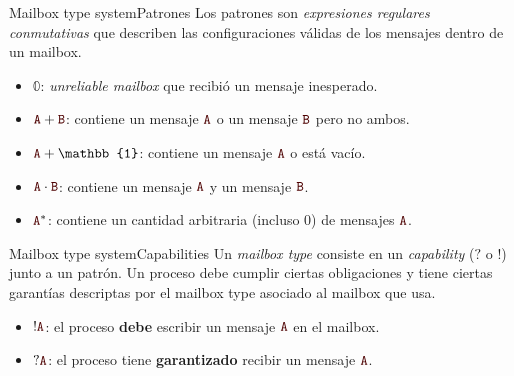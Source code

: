 \documentclass{beamer}
\newcommand{\msgtag}[1]{\texttt{\textcolor{msg-color}{#1}}}
\begin{document}
\begin{frame}{Mailbox type system}{Patrones}
    Los patrones son \emph{expresiones regulares conmutativas} que describen las configuraciones válidas de los mensajes dentro de un mailbox.
    \vspace{1em}
    \begin{itemize}
        \item $\mathbb{0}$: \emph{unreliable mailbox} que recibió un mensaje inesperado.
        \item $\msgtag{A} + \msgtag{B}$: contiene un mensaje $\msgtag{A}$ o un mensaje $\msgtag{B}$ pero no ambos.
        \item $\msgtag{A} + \mathbb{1}$: contiene un mensaje $\msgtag{A}$ o está vacío.
        \item $\msgtag{A} \cdot \msgtag{B}$: contiene un mensaje $\msgtag{A}$ y un mensaje $\msgtag{B}$.
        \item $\msgtag{A}^\ast$: contiene un cantidad arbitraria (incluso $0$) de mensajes $\msgtag{A}$.
    \end{itemize}
\end{frame}

\begin{frame}{Mailbox type system}{Capabilities}
    Un \emph{mailbox type} consiste en un \emph{capability} ($?$ o $!$) junto a un patrón. Un proceso debe cumplir ciertas obligaciones y tiene ciertas garantías descriptas por el mailbox type asociado al mailbox que usa.
    \vspace{1em}
    \begin{itemize}
        \item $!\msgtag{A}$: el proceso \textbf{debe} escribir un mensaje $\msgtag{A}$ en el mailbox.
        \item $?\msgtag{A}$: el proceso tiene \textbf{garantizado} recibir un mensaje $\msgtag{A}$.
    \end{itemize}
\end{frame}
\end{document}
